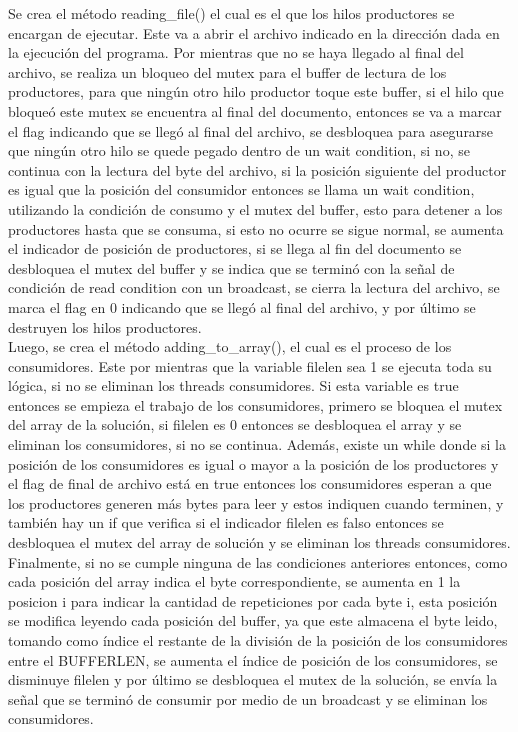 \documentclass[10pt, article, natbib]{IEEEtran}
\begin{document}
Se crea el método reading\_file() el cual es el que los hilos productores se encargan de ejecutar. Este va a abrir el archivo indicado en la dirección dada en la ejecución del programa.\cite{chanilastnam_2015_c} \cite{cppreferencecom_2021_fread} \cite{kerrisk_2010_fseek3} Por mientras que no se haya llegado al final del archivo, se realiza un bloqueo del mutex para el buffer de lectura de los productores, para que ningún otro hilo productor toque este buffer, si el hilo que bloqueó este mutex se encuentra al final del documento, entonces se va a marcar el flag indicando que se llegó al final del archivo, se desbloquea para asegurarse que ningún otro hilo se quede pegado dentro de un wait condition, si no, se continua con la lectura del byte del archivo, si la posición siguiente del productor es igual que la posición del consumidor entonces se llama un wait condition, utilizando la condición de consumo y el mutex del buffer, esto para detener a los productores hasta que se consuma, si esto no ocurre se sigue normal, se aumenta el indicador de posición de productores, si se llega al fin del documento se desbloquea el mutex del buffer y se indica que se terminó con la señal de condición de read condition con un broadcast, se cierra la lectura del archivo, se marca el flag en 0 indicando que se llegó al final del archivo,  y por último se destruyen los hilos productores.\cite{kerrisk_2010_pthread_exit3} \\

Luego, se crea el método adding\_to\_array(), el cual es el proceso de los consumidores. Este por mientras que la variable filelen sea 1 se ejecuta toda su lógica, si no se eliminan los threads consumidores. Si esta variable es true entonces se empieza el trabajo de los consumidores, primero se bloquea el mutex del array de la solución, si filelen es 0 entonces se desbloquea el array y se eliminan los consumidores, si no se continua. Además, existe un while donde si la posición de los consumidores es igual o mayor a la posición de los productores y el flag de final de archivo está en true entonces los consumidores esperan a que los productores generen más bytes para leer y estos indiquen cuando terminen, y también hay un if que verifica si el indicador filelen es falso entonces se desbloquea el mutex del array de solución y se eliminan los threads consumidores. Finalmente, si no se cumple ninguna de las condiciones anteriores entonces, como cada posición del array indica el byte correspondiente, se aumenta en 1 la posicion i para indicar la cantidad de repeticiones por cada byte i, esta posición se modifica leyendo cada posición del buffer, ya que este almacena el byte leido, tomando como índice el restante de la división de la posición de los consumidores entre el BUFFERLEN, se aumenta el índice de posición de los consumidores, se disminuye filelen y por último se desbloquea el mutex de la solución, se envía la señal que se terminó de consumir por medio de un broadcast y se eliminan los consumidores.\\
\end{document}
